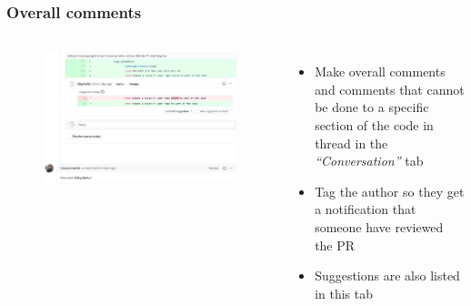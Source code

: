 \documentclass[aspectratio=169]{beamer} %
\begin{document}
\begin{frame}
	\frametitle{Overall comments}
	\begin{columns}[c]

		\vspace{-.75cm}
		\begin{figure}
			\centering
			\includegraphics[width=\textwidth]{./img/pr-comment.png}
		\end{figure}

		\begin{itemize}
			\setlength\itemsep{1em}
			\item Make overall comments and comments
			that cannot be done to a specific section of the code
			in thread in the \textit{``Conversation''} tab
			\item Tag the author so they get a notification
			that someone have reviewed the PR
			\item Suggestions are also listed in this tab
		\end{itemize}

	\end{columns}
\end{frame}
\end{document}
